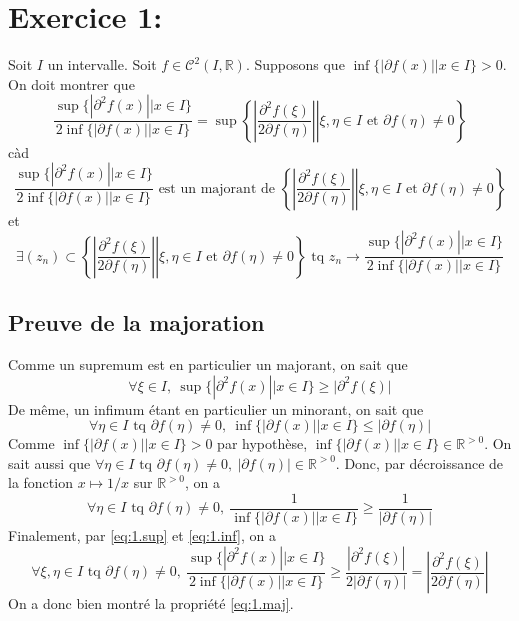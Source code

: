 \documentclass[a4paper, 12pt]{article}
\begin{document}
\newpage
\tableofcontents

\newpage
\section{Exercice 1:}

Soit \( I \) un intervalle. Soit \( f \in \mathcal{C}^2(I, \mathbb{R}) \). Supposons que \( \inf\{|\partial f(x)| | x \in I\} > 0 \). On doit montrer que
$$
\frac{\sup \{ | \partial^2 f(x) || x \in I \}}{2 \inf \{ |\partial f(x)|| x \in I \}}
= \sup \left\{ \left. \left| \frac{\partial^2f(\xi)}{2\partial f(\eta)} \right| \right| \xi, \eta \in I \text{ et } \partial f(\eta) \neq 0 \right\}
$$
càd
\begin{equation}
    \label{eq:1.maj}
    \frac{\sup \{ | \partial^2 f(x) || x \in I \}}{2 \inf \{ |\partial f(x)|| x \in I \}} \text{ est un majorant de }
    \left\{ \left. \left| \frac{\partial^2f(\xi)}{2\partial f(\eta)} \right| \right| \xi, \eta \in I \text{ et } \partial f(\eta) \neq 0 \right\}
\end{equation}
et
\begin{equation}
    \label{eq:1.conv}
    \exists (z_n) \subset
    \left\{ \left. \left| \frac{\partial^2f(\xi)}{2\partial f(\eta)} \right| \right| \xi, \eta \in I \text{ et } \partial f(\eta) \neq 0 \right\}
    \text{ tq } z_n \to
    \frac{\sup \{ | \partial^2 f(x) || x \in I \}}{2 \inf \{ |\partial f(x)|| x \in I \}}
\end{equation}

\subsection{Preuve de la majoration}

Comme un supremum est en particulier un majorant, on sait que
\begin{equation}
    \label{eq:1.sup}
    \forall \xi \in I,~ \sup \{ | \partial^2 f(x) || x \in I \} \geq |\partial^2 f(\xi)|
\end{equation}
De même, un infimum étant en particulier un minorant, on sait que
$$
\forall \eta \in I \text{ tq } \partial f(\eta) \neq 0,~ \inf \{ |\partial f(x)|| x \in I \} \leq |\partial f(\eta)|
$$
Comme \( \inf \{ |\partial f(x)|| x \in I \} > 0 \) par hypothèse, \( \inf \{ |\partial f(x)|| x \in I \} \in \mathbb{R}^{>0} \). On sait aussi que 
\(\forall \eta \in I \text{ tq } \partial f(\eta) \neq 0,~ |\partial f(\eta)| \in \mathbb{R}^{>0} \).
Donc, par décroissance de la fonction \( x \mapsto 1/x \) sur \( \mathbb{R}^{>0} \), on a
\begin{equation}
    \label{eq:1.inf}
    \forall \eta \in I \text{ tq } \partial f(\eta) \neq 0,~ \frac{1}{\inf \{ |\partial f(x)|| x \in I \}} \geq \frac{1}{|\partial f(\eta)|}
\end{equation}
Finalement, par \eqref{eq:1.sup} et \eqref{eq:1.inf}, on a
$$
\forall \xi, \eta \in I \text{ tq } \partial f(\eta) \neq 0,~ \frac{\sup \{ | \partial^2 f(x) || x \in I \}}{2 \inf \{ |\partial f(x)|| x \in I \}}
\geq \frac{| \partial^2f(\xi)|}{2|\partial f(\eta)|}
= \left| \frac{\partial^2f(\xi)}{2\partial f(\eta)} \right|
$$
On a donc bien montré la propriété \eqref{eq:1.maj}.
\end{document}
